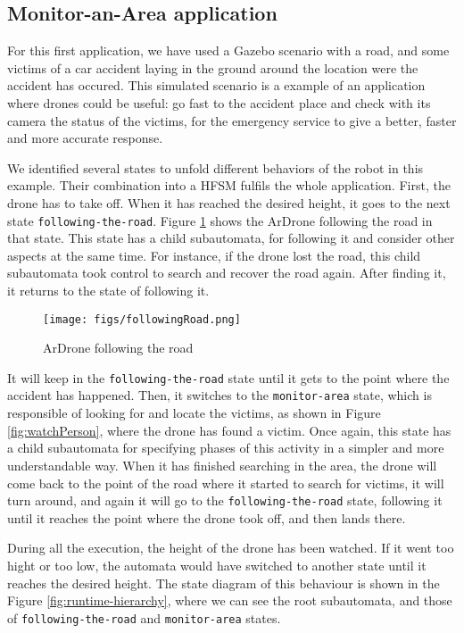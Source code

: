 \documentclass[journal,twoside]{JoPhA}
\begin{document}
\subsection{Monitor-an-Area application}
For this first application, we have used a Gazebo scenario with a road, and some victims of a car accident laying in the ground around the location were the accident has occured. This simulated scenario is a example of an application where drones could be useful: go fast to the accident place and check with its camera the status of the victims, for the emergency service to give a better, faster and more accurate response. 

We identified several states to unfold different behaviors of the robot in this example. Their combination into a HFSM fulfils the whole application. First, the drone has to take off. When it has reached the desired height, it goes to the next state \texttt{following-the-road}. Figure \ref{fig:followingRoad} shows the ArDrone following the road in that state. This state has a child subautomata, for following it and consider other aspects at the same time. For instance, if the drone lost the road, this child subautomata took control to search and recover the road again. After finding it, it returns to the state of following it. 

\begin{figure}[ht!]
\begin{center}
        \texttt{[image: figs/followingRoad.png]}
\end{center}
\caption{ArDrone following the road}
\label{fig:followingRoad}
\end{figure}

It will keep in the \texttt{following-the-road} state until it gets to the point where the accident has happened. Then, it switches to the \texttt{monitor-area} state, which is responsible of looking for and locate the victims, as shown in Figure \ref{fig:watchPerson}, where the drone has found a victim. Once again, this state has a child subautomata for specifying phases of this activity in a simpler and more understandable way. 
When it has finished searching in the area, the drone will come back to the point of the road where it started to search for victims, it will turn around, and again it will go to the \texttt{following-the-road} state, following it until it reaches the point where the drone took off, and then lands there. 

During all the execution, the height of the drone has been watched. If it went too hight or too low, the automata would have switched to another state until it reaches the desired height. The state diagram of this behaviour is shown in the Figure \ref{fig:runtime-hierarchy}, where we can see the root subautomata, and those of \texttt{following-the-road} and  \texttt{monitor-area} states. 
\end{document}
